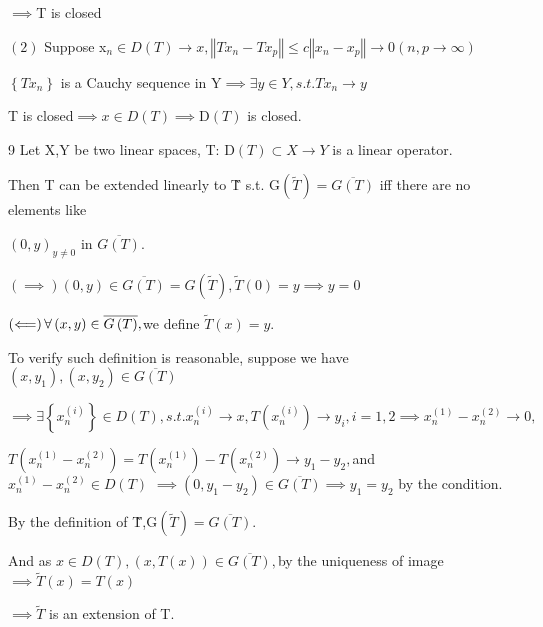 \documentclass{article}
\begin{document}
\begin{CJK}{GBK}{song}
$\implies $T is closed

$\left( 2\right) $ Suppose x$_{n}\in D\left( T\right) \rightarrow
x,\left\Vert Tx_{n}-Tx_{p}\right\Vert \leq c\left\Vert
x_{n}-x_{p}\right\Vert \rightarrow 0\left( n,p\rightarrow \infty \right) $

$\left\{ Tx_{n}\right\} $ is a Cauchy sequence in Y$\implies \exists y\in
Y,s.t.Tx_{n}\rightarrow y$

T is closed$\implies x\in D\left( T\right) \implies $D$\left( T\right) $ is
closed.

9 Let X,Y be two linear spaces, T: D$\left( T\right) \subset X\rightarrow Y$
is a linear operator.

Then T can be extended linearly to \~{T} s.t. G$\left( \tilde{T}\right) =%
\overline{G\left( T\right) }$ iff there are no elements like

$\left( 0,y\right) _{y\neq 0}$ in $\overline{G\left( T\right) }.$

$\left( \implies \right) \left( 0,y\right) \in \overline{G\left( T\right) }%
=G\left( \tilde{T}\right) ,\tilde{T}\left( 0\right) =y\implies y=0$

$\left( \Longleftarrow \right) \forall \left( x,y\right) \in \overline{%
G\left( T\right) },$we define $\tilde{T}\left( x\right) =y.$

To verify such definition is reasonable, suppose we have $\left(
x,y_{1}\right) ,\left( x,y_{2}\right) \in \overline{G\left( T\right) }$

$\implies \exists \left\{ x_{n}^{\left( i\right) }\right\} \in D\left(
T\right) ,s.t.x_{n}^{\left( i\right) }\rightarrow x,T\left( x_{n}^{\left(
i\right) }\right) \rightarrow y_{i},i=1,2\implies x_{n}^{\left( 1\right)
}-x_{n}^{\left( 2\right) }\rightarrow 0,$

$T\left( x_{n}^{\left( 1\right) }-x_{n}^{\left( 2\right) }\right) =T\left(
x_{n}^{\left( 1\right) }\right) -T\left( x_{n}^{\left( 2\right) }\right)
\rightarrow y_{1}-y_{2},$and $x_{n}^{\left( 1\right) }-x_{n}^{\left(
2\right) }\in D\left( T\right) $ $\implies \left( 0,y_{1}-y_{2}\right) \in 
\overline{G\left( T\right) }\implies y_{1}=y_{2}$ by the condition.

By the definition of \~{T},G$\left( \tilde{T}\right) =\overline{G\left(
T\right) }.$

And as $x\in D\left( T\right) ,\left( x,T\left( x\right) \right) \in 
\overline{G\left( T\right) },$by the uniqueness of image$\implies \tilde{T}%
\left( x\right) =T\left( x\right) $

$\implies \tilde{T}$ is an extension of T.


\end{CJK}
\end{document}
